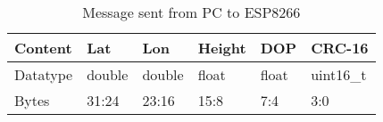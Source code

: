 \begin{table}[H]
\centering

\begin{tabularx}{0.75\textwidth}{@{}|X|X|X|X|X|X|@{}}
\toprule
Content & Lat    & Lon    & Height & DOP   & CRC-16  \\ \midrule
Datatype    & double & double & float  & float & uint16\_t \\ \midrule
Bytes    & 31:24  & 23:16   & 15:8    & 7:4 & 3:0 \\ \bottomrule
\end{tabularx}
\caption{Message sent from PC to ESP8266}
\label{my-label}
\end{table}

